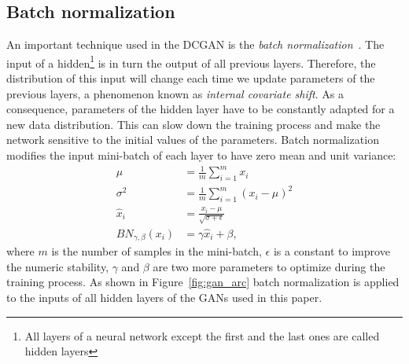 \subsection{Batch normalization}
An important technique used in the DCGAN is the \textit{batch normalization}~\cite{batch_norm}. The input of a hidden\footnote{All layers of a neural network except the first and the last ones are called hidden layers} is in turn the output of all previous layers. Therefore, the distribution of this input will change each time we update parameters of the previous layers, a phenomenon known as \textit{internal covariate shift}. As a consequence, parameters of the hidden layer have to be constantly adapted for a new data distribution. This can slow down the training process and make the network sensitive to the initial values of the parameters. Batch normalization modifies the input mini-batch of each layer to have zero mean and unit variance: 
\begin{align*}
	\mu &= \frac{1}{m} \sum_{i=1}^{m}x_i \\
	\sigma^2 &= \frac{1}{m} \sum_{i=1}^{m}(x_i - \mu)^2 \\
	\hat{x}_i &= \frac{x_i - \mu}{\sqrt{\sigma+\epsilon}} \\
	BN_{\gamma, \beta}(x_i) &= \gamma \hat{x}_i + \beta,
\end{align*}
where $m$ is the number of samples in the mini-batch, $\epsilon$ is a constant to improve the numeric stability, $\gamma$ and $\beta$ are two more parameters to optimize during the training process. As shown in Figure~\ref{fig:gan_arc} batch normalization is applied to the inputs of all hidden layers of the GANs used in this paper.
